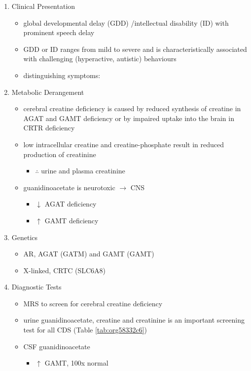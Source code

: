 \documentclass{scrartcl}
\begin{document}
\begin{enumerate}
\item Clinical Presentation
\label{sec:orged0153c}
\begin{itemize}
\item global developmental delay (GDD) /intellectual disability (ID) with
prominent speech delay
\item GDD or ID ranges from mild to severe and is characteristically
associated with challenging (hyperactive, autistic) behaviours
\item distinguishing symptoms:
\end{itemize}

\item Metabolic Derangement
\label{sec:orga16799f}
\begin{itemize}
\item cerebral creatine deficiency is caused by reduced synthesis of
creatine in AGAT and GAMT deficiency or by impaired uptake into the
brain in CRTR deficiency
\item low intracellular creatine and creatine-phosphate result in reduced
production of creatinine
\begin{itemize}
\item \(\therefore\) \low urine and plasma creatinine
\end{itemize}
\item guanidinoacetate is neurotoxic \(\to\) CNS
\begin{itemize}
\item \(\downarrow\) AGAT deficiency
\item \(\uparrow\) GAMT deficiency
\end{itemize}
\end{itemize}

\item Genetics
\label{sec:org0ee789f}
\begin{itemize}
\item AR, AGAT (GATM) and GAMT (GAMT)
\item X-linked, CRTC (SLC6A8)
\end{itemize}
\item Diagnostic Tests
\label{sec:org8860a04}
\begin{itemize}
\item MRS to screen for cerebral creatine deficiency
\item urine guanidinoacetate, creatine and creatinine is an important
screening test for all CDS (Table \ref{tab:org58332c6})
\item CSF guanidinoacetate
\begin{itemize}
\item \(\uparrow\) GAMT, 100x normal
\end{itemize}
\end{itemize}




\end{enumerate}
\end{document}
